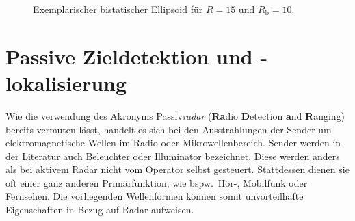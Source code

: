 \begin{figure}[htb]
    \centering
    \caption{Exemplarischer bistatischer Ellipsoid für \(R = 15\) und \(R_\text{b} = 10\).}\label{fig:bistatic_ellipsoid}
\end{figure}

\section{Passive Zieldetektion und -lokalisierung}

Wie die verwendung des Akronyms Passiv\emph{radar} (\textbf{Ra}dio %
\textbf{D}etection %
\textbf{a}nd \textbf{R}anging) bereits vermuten lässt, handelt es sich bei den Ausstrahlungen der Sender um elektromagnetische Wellen im Radio oder Mikrowellenbereich. Sender werden in der Literatur auch Beleuchter oder Illuminator bezeichnet. Diese werden anders als bei aktivem Radar nicht vom Operator selbst gesteuert. Stattdessen dienen sie oft einer ganz anderen Primärfunktion, wie bspw.\ Hör-, Mobilfunk oder Fernsehen. Die vorliegenden Wellenformen können somit unvorteilhafte Eigenschaften in Bezug auf Radar aufweisen.

